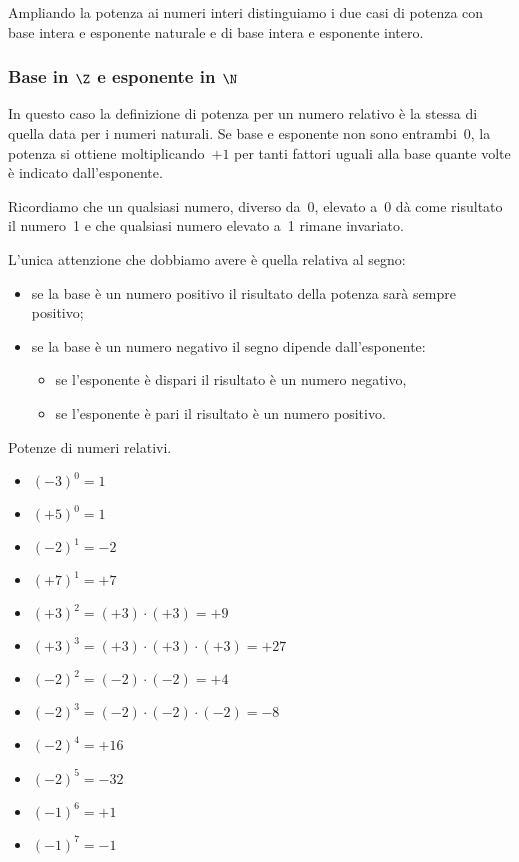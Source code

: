 Ampliando la potenza\indc{\(\Z\)}{\(\coppia{\Z}{\uparrow}\)} 
ai numeri interi distinguiamo i due casi di potenza con 
base intera e esponente naturale e di base intera e esponente intero. 

\subsubsection{Base in 
\texorpdfstring{$\Z$ e esponente in $\N$}{Z e esponente in N}}

In questo caso la definizione di potenza per un numero relativo è la stessa 
di quella data per i numeri naturali.
Se base e esponente non sono entrambi~0, la potenza si ottiene 
moltiplicando~\(+1\) per tanti fattori uguali alla base quante volte è 
indicato dall'esponente.

Ricordiamo che un qualsiasi numero, diverso da~0, elevato a~0 dà come 
risultato il numero~1 e che qualsiasi numero elevato a~1 rimane invariato.

L'unica attenzione che dobbiamo avere è quella relativa al segno:
\begin{itemize} [nosep]
\item se la base è un numero positivo il risultato della potenza sarà 
sempre positivo;
\item se la base è un numero negativo il segno dipende dall'esponente: 
\begin{itemize} [nosep]
\item se l'esponente è dispari il risultato è un numero negativo,
\item se l'esponente è pari il risultato è un numero positivo.
\end{itemize}
\end{itemize}

\begin{esempio}{}{}
Potenze di numeri relativi.
\begin{htmulticols}{2}
\begin{itemize} [noitemsep]
\item \((-3)^0=1\)
\item \((+5)^0=1\) 
\item \((-2)^1=-2\) 
\item \((+7)^1=+7\) 
\item \((+3)^2=(+3)\cdot(+3)=+9\)
\item \((+3)^3=(+3)\cdot(+3)\cdot(+3)=+27\)
\item \((-2)^2=(-2)\cdot(-2)=+4\)
\item \((-2)^3=(-2)\cdot(-2)\cdot(-2)=-8\)
\item \((-2)^4=+16\)
\item \((-2)^5=-32\)
\item \((-1)^6=+1\)
\item \((-1)^7=-1\)
\end{itemize}
\end{htmulticols}
\end{esempio}

